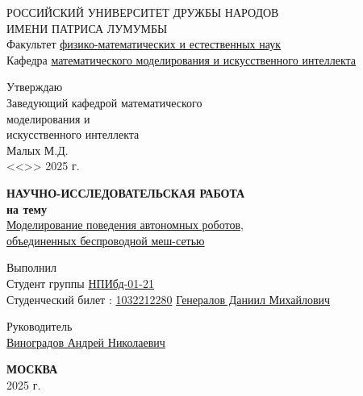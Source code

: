 \documentclass[%
]{article}
\begin{document}
\begin{titlepage}

  \begin{center}
  \hfill \break
  \large{РОССИЙСКИЙ УНИВЕРСИТЕТ ДРУЖБЫ НАРОДОВ}\\
  \large{ИМЕНИ ПАТРИСА ЛУМУМБЫ}\\
  \normalsize{Факультет \underline{физико-математических и естественных наук}}\\ 
  \normalsize{Кафедра \underline{математического моделирования и искусственного интеллекта}}\\

  \vspace*{\fill}

  \begin{flushright}
    \large{Утверждаю}\\
    \normalsize{Заведующий кафедрой} 
    \normalsize{математического \\ моделирования и \\ искусственного интеллекта \\} 
    \underline{\phantom{signature signature}} Малых М.Д. \\
    <<\underline{\phantom{day}}>> \underline{\phantom{month month}} 2025 г.
    \end{flushright}
 
  \vspace*{\fill}
  \Large{\textbf{НАУЧНО-ИССЛЕДОВАТЕЛЬСКАЯ РАБОТА\\ на тему}}
  \\
  \underline{Моделирование поведения автономных роботов,} \\
  \underline{объединенных беспроводной меш-сетью}
  \vspace*{\fill}
  
  \end{center}
   
   \begin{flushright}
    Выполнил \\
    Студент группы \underline{НПИбд-01-21}\\
    Студенческий билет \textnumero{}: \underline{1032212280}
    \underline{Генералов Даниил Михайлович \phantom{signature}}\\ \vspace{0.5cm}
   \end{flushright}

   \vspace*{\fill}

   \begin{flushright}
    Руководитель \\
    \underline{Виноградов Андрей Николаевич \phantom{signature}}\\ \vspace{0.5cm}
   \end{flushright}
   
  \begin{center} \textbf{МОСКВА} \\ 2025 г. \end{center}
  \thispagestyle{empty} %
   
  \end{titlepage}
  
\end{document}
